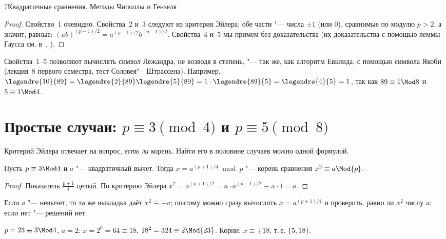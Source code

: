 \begin{lecture}{7}{Квадратичные сравнения. Методы Чиполлы и Гензеля}
\begin{proof}
Свойство~1 очевидно. Свойства~2 и~3 следуют из критерия Эйлера: обе части "--- числа $\pm 1$
(или $0$), сравнимые по модулю $p > 2$, а значит, равные:
$(ab)^{(p-1)/2} = a^{(p-1)/2} b^{(p-1)/2}$. Свойства~4 и~5 мы примем без доказательства
(их доказательства с помощью леммы Гаусса см. в~\cite[гл.~5]{ireland-rosen},
\cite[гл.~V]{vinogradov}).
\end{proof}

Свойства~1--5 позволяют вычислять символ Лежандра, не возводя в степень, "--- так же, как
алгоритм Евклида, с помощью символа Якоби (лекция~8 первого семестра, тест
Соловея"--~Штрассена). Например, $\legendre{10}{89} = \legendre{2}{89}\legendre{5}{89} =
1 \cdot \legendre{89}{5} = \legendre{4}{5} = 1$, так как $89 \equiv 1 \Mod 8$ и
$5 \equiv 1 \Mod 4$.


\section{\texorpdfstring{Простые случаи: $p \equiv 3 \pmod 4$ и $p \equiv 5 \pmod 8$}{Простые случаи: p = 3 (mod 4) и p = 5 (mod 8)}}\label{l7:sec-easy}

Критерий Эйлера отвечает на вопрос, \emph{есть ли} корень. Найти его в половине случаев можно
одной формулой.

\begin{theorem}\label{l7:p34}
Пусть $p \equiv 3 \Mod 4$ и $a$ "--- квадратичный вычет. Тогда $x = a^{(p+1)/4} \bmod p$ "---
корень сравнения $x^2 \equiv a \Mod{p}$.
\end{theorem}

\begin{proof}
Показатель $\frac{p+1}{4}$ целый. По критерию Эйлера
$x^2 = a^{(p+1)/2} = a \cdot a^{(p-1)/2} \equiv a \cdot 1 = a$.
\end{proof}

Если $a$ "--- невычет, то та же выкладка даёт $x^2 \equiv -a$; поэтому можно сразу вычислить
$x = a^{(p+1)/4}$ и проверить, равно ли $x^2$ числу $a$: если нет "--- решений нет.

\begin{example}
$p = 23 \equiv 3 \Mod 4$, $a = 2$: $x = 2^{6} = 64 \equiv 18$, $18^2 = 324 \equiv 2 \Mod{23}$.
Корни: $x \equiv \pm 18$, т.\,е. $\{5, 18\}$.
\end{example}


\end{lecture}
